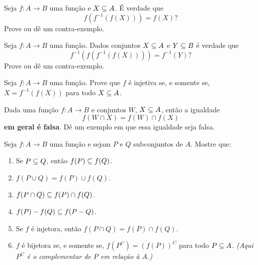 \documentclass[12pt]{exam}
\begin{document}
    \vspace{.3cm}

    \questao{} Seja $f : A \to B$ uma fun\c{c}\~ao e $X \subseteq A$. \'E verdade que
    \[
        f(f^{-1}(f(X))) = f(X)?
    \]
    Prove ou d\^e um contra-exemplo.

    \vspace{.3cm}

    \questao{} Seja $f : A \to B$ uma fun\c{c}\~ao. Dados conjuntos $X \subseteq A$ e $Y \subseteq B$ \'e verdade que
    \[
        f^{-1}(f(f^{-1}(f(X)))) = f^{-1}(Y)?
    \]
    Prove ou d\^e um contra-exemplo.

    \vspace{.3cm}

    \questao{} Seja $f : A \to B$ uma fun\c{c}\~ao. Prove que $f$ \'e injetiva se, e somente se, $X = f^{-1}(f(X))$ para todo $X \subseteq A$.

    \vspace{.3cm}

    \questao{} Dada uma fun\c{c}\~ao $f : A \to B$ e conjuntos $W$, $X \subseteq A$, ent\~ao a igualdade
    \[
        f(W \cap X) = f(W) \cap f(X)
    \]
    \textbf{em geral \'e falsa}. D\^e um exemplo em que essa igualdade seja falsa.

    \vspace{.3cm}

    \questao{} Seja $f : A \to B$ uma fun\c{c}\~ao e sejam $P$ e $Q$ subconjuntos de $A$. Mostre que:
    \begin{enumerate}[label={\alph*})]
        \item Se $P\subseteq Q$, ent{\~a}o $f(P)\subseteq f(Q)$.
        \item $f(P\cup Q) = f(P)\cup f(Q)$.

        \item $f(P\cap Q)\subseteq f(P)\cap f(Q)$.

        \item $f(P) - f(Q) \subseteq f(P - Q)$.

        \item Se $f$ {\'e} injetora, ent{\~a}o $f(P\cap Q) =  f(P)\cap f(Q)$.

        \item $f$ {\'e} bijetora se, e somente se, $f(P^C) = (f(P))^C$ para todo $P \subseteq A$. \textit{(Aqui $P^C$ \'e o complementar de $P$ em rela\c{c}\~ao \`a $A$.)}
    \end{enumerate}

    \vspace{.3cm}
\end{document}
